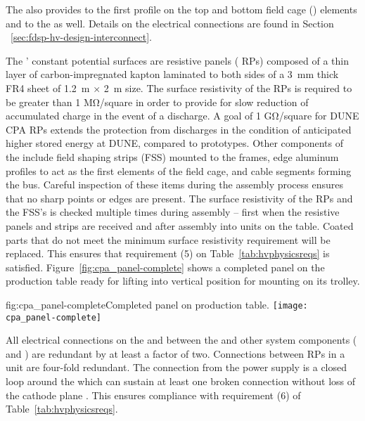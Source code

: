 The  also provides  to the first profile on the top and bottom field cage () elements and to the  as well. %
Details on the electrical connections are found in Section ~\ref{sec:fdsp-hv-design-interconnect}.

The ' constant potential surfaces are resistive panels ( RPs) composed of a thin layer of carbon-impregnated kapton  laminated to both sides of a \SI{3}{\milli\meter} thick FR4 sheet of \SI{1.2}{\meter}  $\times$ \SI{2}{\meter} size.  The surface resistivity of the  RPs is required to be greater than 1 M\si{\ohm}/square in order to provide for slow reduction of accumulated charge in the event of a discharge.  A goal of 1 G\si{\ohm}/square for DUNE CPA RPs extends the protection from discharges in the condition of anticipated higher stored energy at DUNE, compared to prototypes. Other  components of the  include field shaping strips (FSS) mounted to the  frames, edge aluminum profiles to act as the first elements of the field cage, and cable segments forming the  bus. Careful inspection of these items during the assembly process ensures that no sharp points or edges are present. The surface resistivity of the  RPs and the FSS's is checked multiple times during assembly -- first when the resistive panels and strips are received and after assembly into  units on the table.  Coated parts that do not meet the minimum surface resistivity requirement will be replaced.  This ensures that requirement (5) on Table~\ref{tab:hvphysicsreqs} is satisfied.  Figure~\ref{fig:cpa_panel-complete} shows a completed  panel on the production table ready for lifting into vertical position for mounting on its trolley.

\begin{dunefigure}{fig:cpa_panel-complete}{Completed   panel on production table.}
\texttt{[image: cpa\_panel-complete]}
\end{dunefigure}

All electrical connections on the  and between the  and other  system components ( and ) are redundant by at least a factor of two.  Connections between RPs in a unit are four-fold redundant.  The  connection from the  power supply is a closed loop around the  which can sustain at least one broken connection without loss of the cathode plane .  This ensures compliance with %
requirement (6) of Table~\ref{tab:hvphysicsreqs}.

